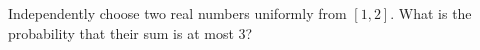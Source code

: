 Independently choose two real numbers uniformly from $[1,2]$. What is the probability that their sum is at most $3$?
